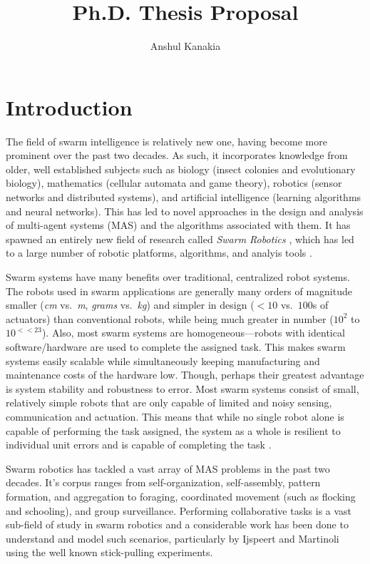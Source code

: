 \documentclass[11pt, onecolumn, compsoc, letterpaper]{article}
\begin{document}
\title{Ph.D. Thesis Proposal}
\author{Anshul Kanakia}

\maketitle

\section{Introduction}
The field of swarm intelligence is relatively new one, having become more prominent over the past two decades. As such, it incorporates knowledge from older, well established subjects such as biology (insect colonies and evolutionary biology), mathematics (cellular automata and game theory), robotics (sensor networks and distributed systems), and artificial intelligence (learning algorithms and neural networks). This has led to novel approaches in the design and analysis of multi-agent systems (MAS) and the algorithms associated with them. It has spawned an entirely new field of research called \emph{Swarm Robotics} \cite{Sahin2005}, which has led to a large number of robotic platforms, algorithms, and analyis tools \cite{Brambilla2013}.

Swarm systems have many benefits over traditional, centralized robot systems. The robots used in swarm applications are generally many orders of magnitude smaller (\emph{cm} vs.~\emph{m}, \emph{grams} vs.~\emph{kg}) and simpler in design ($<10$ vs.~$100$s of actuators) than conventional robots, while being much greater in number ($10^2$ to $10^{<<23}$). Also, most swarm systems are homogeneous---robots with identical software/hardware are used to complete the assigned task. This makes swarm systems easily scalable while simultaneously keeping manufacturing and maintenance costs of the hardware low. Though, perhaps their greatest advantage is system stability and robustness to error. Most swarm systems consist of small, relatively simple robots that are only capable of limited and noisy sensing, communication and actuation. This means that while no single robot alone is capable of performing the task assigned, the system as a whole is resilient to individual unit errors and is capable of completing the task \cite{Winfield2005}.

Swarm robotics has tackled a vast array of MAS problems in the past two decades. It's corpus ranges from self-organization, self-assembly, pattern formation, and aggregation to foraging, coordinated movement (such as flocking and schooling), and group surveillance. Performing collaborative tasks is a vast sub-field of study in swarm robotics and a considerable work has been done to understand and model such scenarios, particularly by Ijspeert and Martinoli using the well known stick-pulling experiments. 
\end{document}

